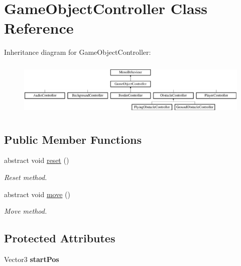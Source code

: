 \hypertarget{class_game_object_controller}{}\section{Game\+Object\+Controller Class Reference}
\label{class_game_object_controller}
Inheritance diagram for Game\+Object\+Controller\+:\begin{figure}[H]
\begin{center}
\leavevmode
\includegraphics[height=2.666667cm]{class_game_object_controller}
\end{center}
\end{figure}
\subsection*{Public Member Functions}
\begin{DoxyCompactItemize}
\item 
abstract void \hyperlink{class_game_object_controller_a5e57dfd66120a1400e5947f5664a41e4}{reset} ()
\begin{DoxyCompactList}\small\item\em Reset method. \end{DoxyCompactList}\item 
abstract void \hyperlink{class_game_object_controller_a0d186d143e280869efaff7835730fc82}{move} ()
\begin{DoxyCompactList}\small\item\em Move method. \end{DoxyCompactList}\end{DoxyCompactItemize}
\subsection*{Protected Attributes}
\begin{DoxyCompactItemize}
\item 
\hypertarget{class_game_object_controller_a5a9949c435172a4f92d73c3d38826f2a}{}\label{class_game_object_controller_a5a9949c435172a4f92d73c3d38826f2a} 
Vector3 {\bfseries start\+Pos}
\end{DoxyCompactItemize}


